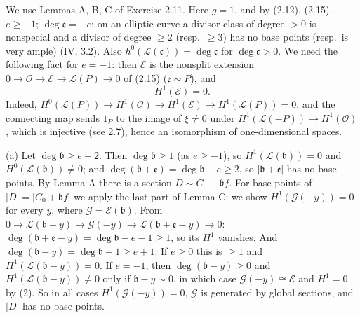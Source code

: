 \documentclass[11pt]{article}
\begin{document}
\pf
We use Lemmas A, B, C of Exercise 2.11. Here $g=1$, and by (2.12), (2.15), $e\ge-1$; $\deg\mathfrak e=-e$; on an elliptic curve a divisor class of degree $>0$ is nonspecial and a divisor of degree $\ge2$ (resp.\ $\ge3$) has no base points (resp.\ is very ample) (IV, 3.2). Also $h^0(\mathcal L(\mathfrak c))=\deg\mathfrak c$ for $\deg\mathfrak c>0$. We need the following fact for $e=-1$: then $\mathcal E$ is the nonsplit extension $0\to\mathcal O\to\mathcal E\to\mathcal L(P)\to0$ of (2.15) ($\mathfrak e\sim P$), and
\[ H^1(\mathcal E)=0.\tag{2} \]
Indeed, $H^0(\mathcal L(P))\to H^1(\mathcal O)\to H^1(\mathcal E)\to H^1(\mathcal L(P))=0$, and the connecting map sends $1_P$ to the image of $\xi\ne0$ under $H^1(\mathcal L(-P))\to H^1(\mathcal O)$, which is injective (see 2.7), hence an isomorphism of one-dimensional spaces.

(a) Let $\deg\mathfrak b\ge e+2$. Then $\deg\mathfrak b\ge1$ (as $e\ge-1$), so $H^1(\mathcal L(\mathfrak b))=0$ and $H^0(\mathcal L(\mathfrak b))\ne0$; and $\deg(\mathfrak b+\mathfrak e)=\deg\mathfrak b-e\ge2$, so $|\mathfrak b+\mathfrak e|$ has no base points. By Lemma A there is a section $D\sim C_0+\mathfrak bf$. For base points of $|D|=|C_0+\mathfrak bf|$ we apply the last part of Lemma C: we show $H^1(\mathcal G(-y))=0$ for every $y$, where $\mathcal G=\mathcal E(\mathfrak b)$. From $0\to\mathcal L(\mathfrak b-y)\to\mathcal G(-y)\to\mathcal L(\mathfrak b+\mathfrak e-y)\to0$: $\deg(\mathfrak b+\mathfrak e-y)=\deg\mathfrak b-e-1\ge1$, so its $H^1$ vanishes. And $\deg(\mathfrak b-y)=\deg\mathfrak b-1\ge e+1$. If $e\ge0$ this is $\ge1$ and $H^1(\mathcal L(\mathfrak b-y))=0$. If $e=-1$, then $\deg(\mathfrak b-y)\ge0$ and $H^1(\mathcal L(\mathfrak b-y))\ne0$ only if $\mathfrak b-y\sim0$, in which case $\mathcal G(-y)\cong\mathcal E$ and $H^1=0$ by (2). So in all cases $H^1(\mathcal G(-y))=0$, $\mathcal G$ is generated by global sections, and $|D|$ has no base points.
\end{document}
